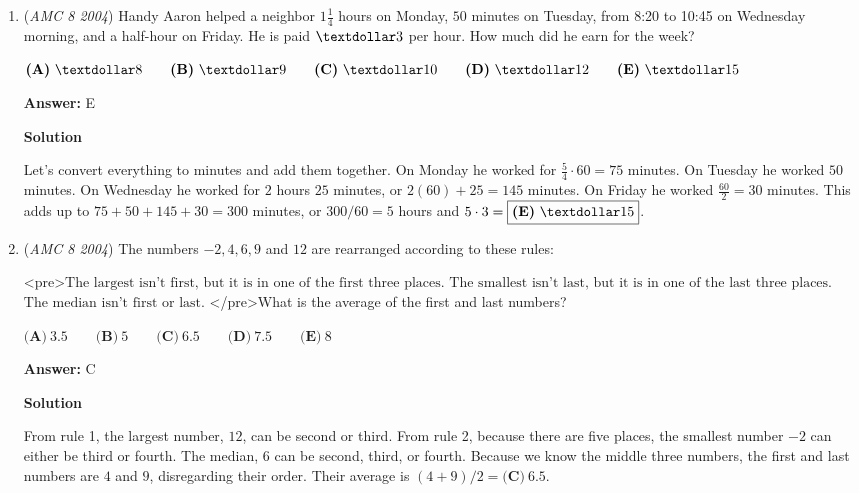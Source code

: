 \begin{enumerate}
 


	\item (\textit{AMC 8 2004}) Handy Aaron helped a neighbor $1 \frac14$ hours on Monday, $50$ minutes on Tuesday, from 8:20 to 10:45 on Wednesday morning, and a half-hour on Friday. He is paid $\textdollar 3$ per hour. How much did he earn for the week?


 $\textbf{(A)}\ \textdollar 8 \qquad \textbf{(B)}\ \textdollar 9 \qquad \textbf{(C)}\ \textdollar 10 \qquad \textbf{(D)}\ \textdollar 12 \qquad \textbf{(E)}\ \textdollar 15$

 \textbf{Answer: }E



\textbf{Solution}

Let's convert everything to minutes and add them together. On Monday he worked for $\frac54 \cdot 60 = 75$ minutes. On Tuesday he worked $50$ minutes. On Wednesday he worked for $2$ hours $25$ minutes, or $2(60)+25=145$ minutes. On Friday he worked $\frac{60}{2}=30$ minutes. This adds up to $75+50+145+30=300$ minutes, or $300/60=5$ hours and $5\cdot 3 = \boxed{\textbf{(E)}\ \textdollar 15}$.

 


	\item (\textit{AMC 8 2004}) The numbers $-2, 4, 6, 9$ and $12$ are rearranged according to these rules:


 <pre>$\text {The largest isn’t first, but it is in one of the first three places.}$                                                          
$\text {The smallest isn’t last, but it is in one of the last three places.}$          
$\text {The median isn’t first or last.}$                     
</pre>What is the average of the first and last numbers?


 $\textbf{(A)}\ 3.5 \qquad \textbf{(B)}\ 5 \qquad \textbf{(C)}\ 6.5 \qquad \textbf{(D)}\ 7.5 \qquad \textbf{(E)}\ 8$

 \textbf{Answer: }C



\textbf{Solution}

From rule 1, the largest number, $12$, can be second or third. From rule 2, because there are five places, the smallest number $-2$ can either be third or fourth. The median, $6$ can be second, third, or fourth. Because we know the middle three numbers, the first and last numbers are $4$ and $9$, disregarding their order. Their average is $(4+9)/2 = \boxed{\textbf{(C)}\ 6.5}$.

 



\end{enumerate}

